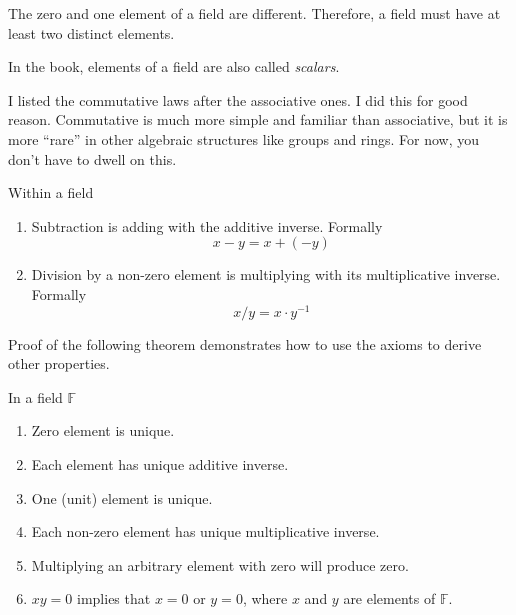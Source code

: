 \begin{note}
	The zero and one element of a field are different. Therefore, a field must have at least two distinct elements.

	In the book, elements of a field are also called \textit{scalars}.

	I listed the commutative laws after the associative ones. I did this for good reason. Commutative is much more simple and familiar than associative, but it is more ``rare'' in other algebraic structures like groups and rings. For now, you don't have to dwell on this.
\end{note}

\begin{definition}
	Within a field
	\begin{enumerate}
		\item Subtraction is adding with the additive inverse. Formally
		      \[
			      x - y = x + (-y)
		      \]
		\item Division by a non-zero element is multiplying with its multiplicative inverse. Formally
		      \[
			      x / y = x\cdot y^{-1}
		      \]
	\end{enumerate}
\end{definition}

Proof of the following theorem demonstrates how to use the axioms to derive other properties.

\begin{theorem}\label{thm:field-properties}
	In a field $\mathbb{F}$
	\begin{enumerate}[label = (\roman*)]
		\item Zero element is unique.
		\item Each element has unique additive inverse.
		\item One (unit) element is unique.
		\item Each non-zero element has unique multiplicative inverse.
		\item Multiplying an arbitrary element with zero will produce zero.
		\item $xy = 0$ implies that $x = 0$ or $y = 0$, where $x$ and $y$ are elements of $\mathbb{F}$.
	\end{enumerate}
\end{theorem}

